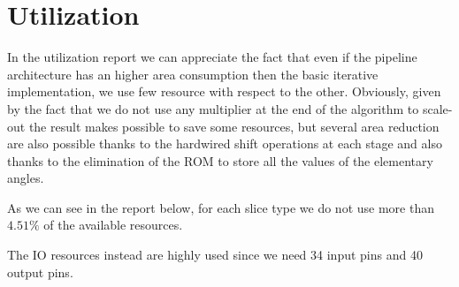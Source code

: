 \section{Utilization}\label{sec:utilization}

In the utilization report we can appreciate the fact that even if the pipeline
architecture has an higher area consumption then the basic iterative
implementation, we use few resource with respect to the other. Obviously, given
by the fact that we do not use any multiplier at the end of the algorithm to
scale-out the result makes possible to save some resources, but several area
reduction are also possible thanks to the hardwired shift operations at each
stage and also thanks to the elimination of the ROM to store all the values of
the elementary angles.

As we can see in the report below, for each slice type we do not use more
than \(4.51\%\) of the available resources.

The IO resources instead are highly used since we need 34 input pins and 40
output pins.

